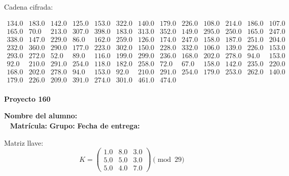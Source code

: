 \documentclass[12pt]{article}
\begin{document}
Cadena cifrada:
\begin{center}
$\begin{array}{lllllllllllll}
134.0 & 183.0 & 142.0 & 125.0 & 153.0 & 322.0 & 140.0 & 179.0 & 226.0 & 108.0 & 214.0 & 186.0 & 107.0\\
165.0 & 70.0 & 213.0 & 307.0 & 398.0 & 183.0 & 313.0 & 352.0 & 149.0 & 295.0 & 250.0 & 165.0 & 247.0\\
338.0 & 147.0 & 229.0 & 86.0 & 162.0 & 259.0 & 126.0 & 174.0 & 247.0 & 158.0 & 187.0 & 251.0 & 204.0\\
232.0 & 360.0 & 290.0 & 177.0 & 223.0 & 302.0 & 150.0 & 228.0 & 332.0 & 106.0 & 139.0 & 226.0 & 153.0\\
293.0 & 272.0 & 52.0 & 89.0 & 116.0 & 199.0 & 299.0 & 236.0 & 168.0 & 202.0 & 278.0 & 94.0 & 153.0\\
92.0 & 210.0 & 291.0 & 254.0 & 118.0 & 182.0 & 258.0 & 72.0 & 67.0 & 158.0 & 142.0 & 235.0 & 220.0\\
168.0 & 202.0 & 278.0 & 94.0 & 153.0 & 92.0 & 210.0 & 291.0 & 254.0 & 179.0 & 253.0 & 262.0 & 140.0\\
179.0 & 226.0 & 209.0 & 391.0 & 274.0 & 301.0 & 461.0 & 474.0\\
\end{array}$
\end{center}

\newpage


\textbf{Proyecto 160}

\textbf{Nombre del alumno:} \underline{\hspace{13cm}}\\\
\vspace{1cm}
\textbf{Matrícula:} \underline{\hspace{4cm}} \hspace{1cm}
\textbf{Grupo:} \underline{\hspace{2cm}}
\textbf{Fecha de entrega:} \underline{\hspace{2cm}}

\medskip

Matriz llave:
\[
K = \begin{pmatrix}
1.0 & 8.0 & 3.0\\
5.0 & 5.0 & 3.0\\
5.0 & 4.0 & 7.0
\end{pmatrix} \pmod{29}
\]
\end{document}
